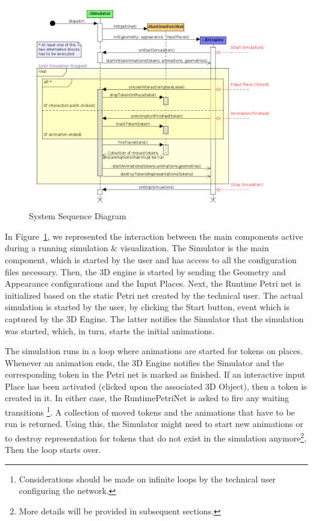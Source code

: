 \begin{figure}[ht]
   \begin{center}
       \includegraphics[scale=0.50]{image/system_sequence_diagram.png}
       \caption{System Sequence Diagram}
       \label{fig_ssd}
       \end{center}
   \end{figure}

In Figure~\ref{fig_ssd}, we represented the interaction between the main components active during a
running simulation \& visualization. The Simulator is the main component, which is started by the
user and has access to all the configuration files necessary. Then, the 3D engine is started by sending
the Geometry and Appearance configurations and the Input Places. Next, the Runtime Petri net is
initialized based on the static Petri net created by the technical user. The actual simulation is started
by the user, by clicking the Start button, event which is captured by the 3D Engine. 
The latter notifies the Simulator that the simulation was started, which, in turn, starts the
initial animations.

The simulation runs in a loop where animations are started for tokens on places. Whenever
an animation ends, the 3D Engine notifies the Simulator and the corresponding token in the Petri net
is marked as finished. If an interactive input Place has been activated (clicked upon the associated 3D Object),
then a token is created in it. In either case, the RuntimePetriNet is asked to fire any waiting
transitions \footnote{Considerations should be made on infinite loops by the technical user
configuring the network.}. A collection of moved tokens and the animations that have to be run is
returned. Using this, the Simulator might need to start new animations or to destroy representation
for tokens that do not exist in the simulation anymore\footnote{More details will be provided in
subsequent sections.}. Then the loop starts over.

